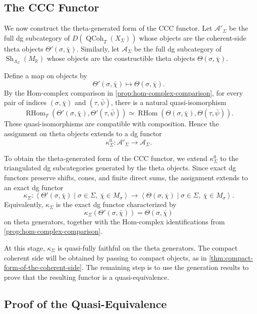 \subsection{The CCC Functor}
\label{subsec:ccc-functor}

We now construct the theta-generated form of the CCC functor. Let
\(\mathcal A'_\Sigma\) be the full dg subcategory of
\(D(\operatorname{QCoh}_T(X_\Sigma))\) whose objects are the coherent-side theta
objects \(\Theta'(\sigma,\bar\chi)\). Similarly, let \(\mathcal A_\Sigma\) be
the full dg subcategory of \(\operatorname{Sh}_{\Lambda_\Sigma}(M_{\mathbb R})\)
whose objects are the constructible theta objects \(\Theta(\sigma,\bar\chi)\).

Define a map on objects by
\[
\Theta'(\sigma,\bar\chi)\longmapsto \Theta(\sigma,\bar\chi).
\]
By the Hom-complex comparison in \cref{prop:hom-complex-comparison}, for every
pair of indices \((\sigma,\bar\chi)\) and \((\tau,\bar\psi)\), there is a natural
quasi-isomorphism
\[
\operatorname{RHom}_T(\Theta'(\sigma,\bar\chi),\Theta'(\tau,\bar\psi))
\simeq
\operatorname{RHom}(\Theta(\sigma,\bar\chi),\Theta(\tau,\bar\psi)).
\]
These quasi-isomorphisms are compatible with composition. Hence the assignment
on theta objects extends to a dg functor
\[
\kappa^0_\Sigma:\mathcal A'_\Sigma\longrightarrow \mathcal A_\Sigma .
\]

To obtain the theta-generated form of the CCC functor, we extend
\(\kappa^0_\Sigma\) to the triangulated dg subcategories generated by the theta
objects. Since exact dg functors preserve shifts, cones, and finite direct sums,
the assignment extends to an exact dg functor
\[
\kappa_\Sigma:
\left\langle
\Theta'(\sigma,\bar\chi)\mid \sigma\in\Sigma,\ \bar\chi\in M_\sigma
\right\rangle
\longrightarrow
\left\langle
\Theta(\sigma,\bar\chi)\mid \sigma\in\Sigma,\ \bar\chi\in M_\sigma
\right\rangle .
\]
Equivalently, \(\kappa_\Sigma\) is the exact dg functor characterized by
\[
\kappa_\Sigma(\Theta'(\sigma,\bar\chi))=\Theta(\sigma,\bar\chi)
\]
on theta generators, together with the Hom-complex identifications from
\cref{prop:hom-complex-comparison}.

At this stage, \(\kappa_\Sigma\) is quasi-fully faithful on the theta
generators. The compact coherent side will be obtained by passing to compact
objects, as in \cref{thm:compact-form-of-the-coherent-side}. The remaining step
is to use the generation results to prove that the resulting functor is a
quasi-equivalence.

\subsection{Proof of the Quasi-Equivalence}
\label{subsec:proof-quasi-equivalence}

